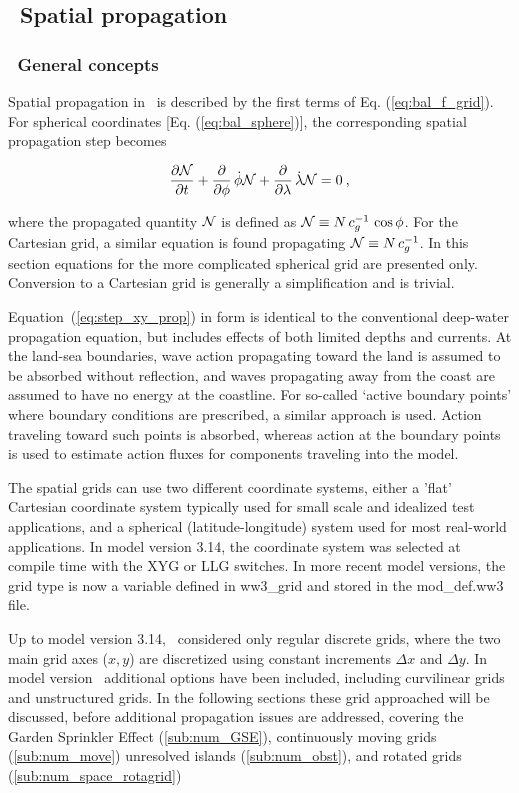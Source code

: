 \vssub
\subsection{~Spatial propagation} \label{sub:xy_prop}
\vssub
\subsubsection{~General concepts}
\vsssub

Spatial propagation in \ws\ is described by the first terms of
Eq. (\ref{eq:bal_f_grid}). For spherical coordinates
[Eq. (\ref{eq:bal_sphere})], the corresponding spatial propagation step
becomes


\begin{equation}
\frac{\partial {\cal N}}{\partial t} + \frac{\partial}{\partial \phi} \, \dot{\phi} {\cal N} +
\frac{\partial}{\partial \lambda} \, \dot{\lambda} {\cal N} = 0
\: , \label{eq:step_xy_prop} 
\end{equation}

\noindent 
where the propagated quantity ${\cal N}$ is defined as ${\cal N} \equiv N \, c_g^{-1} \,
\cos\phi$. For the Cartesian grid, a similar equation is found propagating
${\cal N} \equiv N \, c_g^{-1}$. In this section equations for the more complicated
spherical grid are presented only. Conversion to a Cartesian grid is generally
a simplification and is trivial.

Equation~(\ref{eq:step_xy_prop}) in form is identical to the conventional
deep-water propagation equation, but includes effects of both limited depths
and currents. At the land-sea boundaries, wave action propagating toward the
land is assumed to be absorbed without reflection, and waves propagating away
from the coast are assumed to have no energy at the coastline. For so-called
`active boundary points' where boundary conditions are prescribed, a similar
approach is used. Action traveling toward such points is absorbed, whereas
action at the boundary points is used to estimate action fluxes for components
traveling into the model.

The spatial grids can use two different coordinate systems, either a 'flat'
Cartesian coordinate system typically used for small scale and idealized test
applications, and a spherical (latitude-longitude) system used for most
real-world applications. In model version 3.14, the coordinate system was
selected at compile time with the {\code XYG} or {\code LLG} switches. In more
recent model versions, the grid type is now a variable defined in {\file
ww3\_grid} and stored in the {\file mod\_def.ww3} file.

Up to model version 3.14, \ws\ considered only regular discrete grids,
where the two main grid axes ($x,y$) are discretized using constant
increments $\Delta x$ and $\Delta y$. In model version \WWver\
additional options have been included, including curvilinear grids and
unstructured grids. In the following sections these grid approached
will be discussed, before additional propagation issues are addressed,
covering the Garden Sprinkler Effect (\ref{sub:num_GSE}), continuously
moving grids (\ref{sub:num_move}) unresolved islands
(\ref{sub:num_obst}), and rotated grids (\ref{sub:num_space_rotagrid})
